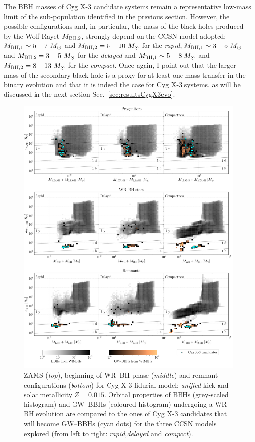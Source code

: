 \documentclass[a4paper,titlepage]{book}     	%
\newcommand{\sun}{\ensuremath{_\odot}}
\newcommand{\msun}{\ensuremath{M\sun}}
\begin{document}
The BBH masses of Cyg X-3 candidate systems remain a representative low-mass limit of the sub-population identified in the previous section. However, the possible configurations and, in particular, the mass of the black holes produced by the Wolf-Rayet $M_{\rm BH,2}$, strongly depend on the CCSN model adopted: $M_{\rm BH,1} \sim 5-7~\msun$ and $M_{\rm BH,2}=5-10~\msun$ for the \emph{rapid}, $M_{\rm BH,1} \sim 3-5~\msun$ and $M_{\rm BH,2}=3-5~\msun$ for the \emph{delayed} and $M_{\rm BH,1} \sim 5-8~\msun$ and $M_{\rm BH,2}=8-13~\msun$ for the \emph{compact}. Once again, I point out that the larger mass of the secondary black hole is a proxy for at least one mass transfer in the binary evolution and that it is indeed the case for Cyg X-3 systems, as will be discussed in the next section Sec.\ \ref{sec:resultsCygX3evo}.



\begin{figure}
	\centering
	\includegraphics[width=\textwidth]{./images/binary_unified265_015.pdf}
	\caption{ZAMS (\emph{top}), beginning of WR--BH phase (\emph{middle}) and remnant configurations (\emph{bottom}) for Cyg X-3 fiducial model: \emph{unified} kick and solar metallicity $Z=0.015$. Orbital properties of BBHs (grey-scaled histogram) and GW--BBHs (coloured histogram) undergoing a WR--BH evolution are compared to the ones of Cyg X-3 candidates that will become GW--BBHs (cyan dots) for the three CCSN models explored (from left to right: \emph{rapid},\emph{delayed} and \emph{compact}).}\label{fig:resultskickunified265Z015evolutionCygX3}
\end{figure}
\end{document}

